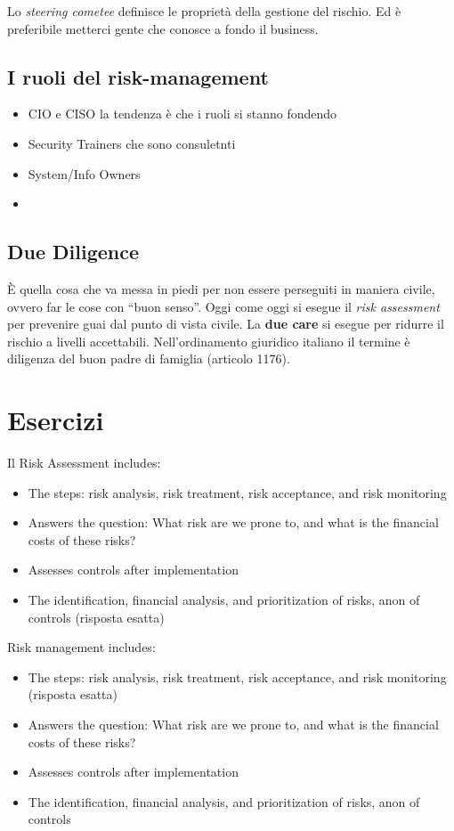Lo \textit{steering cometee} definisce le proprietà della gestione del rischio. 
Ed è preferibile metterci gente che conosce a fondo il business.

\subsection{I ruoli del risk-management}
\begin{itemize}
\item CIO e CISO la tendenza è che i ruoli si stanno fondendo
\item Security Trainers che sono consuletnti
\item System/Info Owners
\item {}
\end{itemize}

\subsection{Due Diligence}

È quella cosa che va messa in piedi per non essere perseguiti in maniera civile, 
ovvero far le cose con ``buon senso''. Oggi come oggi si esegue il \textit{risk 
assessment} per prevenire guai dal punto di vista civile. La \textbf{due care} 
si esegue per ridurre il rischio a livelli accettabili. Nell'ordinamento 
giuridico italiano il termine è diligenza del buon padre di famiglia (articolo 
1176).


\section{Esercizi}

Il Risk Assessment includes:
\begin{itemize}
\item The steps: risk analysis, risk treatment, risk acceptance, and risk 
monitoring
\item Answers the question: What risk are we prone to, and what is the financial 
costs of these risks?
\item Assesses controls after implementation
\item The identification, financial analysis, and prioritization of risks, anon 
of controls (risposta esatta)
\end{itemize}


Risk management includes:
\begin{itemize}
\item The steps: risk analysis, risk treatment, risk acceptance, and risk 
monitoring (risposta esatta)
\item Answers the question: What risk are we prone to, and what is the financial 
costs of these risks?
\item Assesses controls after implementation
\item The identification, financial analysis, and prioritization of risks, anon 
of controls
\end{itemize}

